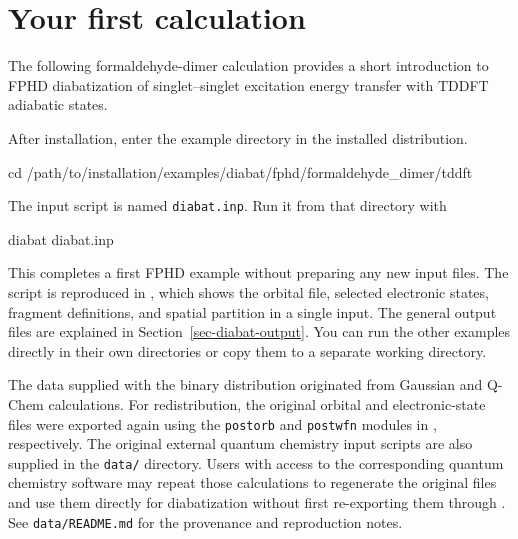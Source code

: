\section{Your first calculation}\label{sec-quickstart}
The following formaldehyde-dimer calculation provides a short introduction to FPHD diabatization of singlet--singlet excitation energy transfer with TDDFT adiabatic states.

After installation, enter the example directory in the installed distribution.
\begin{lst-installation}
cd /path/to/installation/examples/diabat/fphd/formaldehyde_dimer/tddft
\end{lst-installation}
The input script is named \texttt{diabat.inp}. Run it from that directory with
\begin{lst-installation}
diabat diabat.inp
\end{lst-installation}
This completes a first FPHD example without preparing any new input files. The script is reproduced in , which shows the orbital file, selected electronic states, fragment definitions, and spatial partition in a single input.
The general output files are explained in Section~\ref{sec-diabat-output}. You can run the other examples directly in their own directories or copy them to a separate working directory.

The data supplied with the binary distribution originated from Gaussian and Q-Chem calculations. For redistribution, the original orbital and electronic-state files were exported again using the \texttt{postorb} and \texttt{postwfn} modules in \progname{}, respectively. The original external quantum chemistry input scripts are also supplied in the \texttt{data/} directory. Users with access to the corresponding quantum chemistry software may repeat those calculations to regenerate the original files and use them directly for diabatization without first re-exporting them through \progname{}. See \texttt{data/README.md} for the provenance and reproduction notes.
